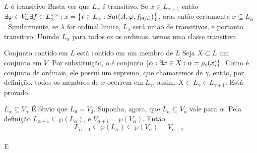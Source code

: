         \begin{lemma}{$L$ é transitivo}
            Basta ver que $L_\alpha$ é transitivo. Se $x\in L_{\alpha+1}$ então $\exists\varphi\in V_\omega\exists f\in L_\alpha^{<\omega}: x 
            = \SET{t\in L_\alpha : Sat(A,\varphi,f_{[0\slash t]})}$, oras então certamente $x \subseteq L_\alpha$. Similarmente, 
            se $\lambda$ for ordinal limite, $L_\lambda$ será união de transitivos, e portanto transitivo. Unindo $L_\alpha$ para todos os 
            os ordinais, temos uma classe transitiva.
        \end{lemma}
        \begin{lemma}{Conjunto contido em $L$ está contido em um membro de $L$}
            Seja $X\subset L$ um conjunto em $V$. Por substituição, o é conjunto $\SET{\alpha: \exists x\in X:\alpha = \rho_c(x)}$. 
            Como é conjunto de ordinais, ele possuí um supremo, que chamaremos de $\gamma$, então, por definição, todos os membros 
            de $x$ ocorrem em $L_\gamma$, assim, $X\subset L_\gamma\in L_{\gamma+1}$. Está provado.
        \end{lemma}
        \begin{lemma}{$L_\alpha\subseteq V_\alpha$}
            É óbvio que $L_\emptyset = V_\emptyset$. Suponha, agora, que $L_\alpha\subseteq V_\alpha$ vale para $\alpha$.
            Pela definição $L_{\alpha+1}\subseteq\wp(L_\alpha)$, e $V_{\alpha+1}=\wp(V_\alpha)$. Então 
            $$L_{\alpha+1}\subseteq\wp(L_\alpha)\subseteq\wp(V_\alpha)=V_{\alpha+1}$$
            \paragraph{}
                E
        \end{lemma}

